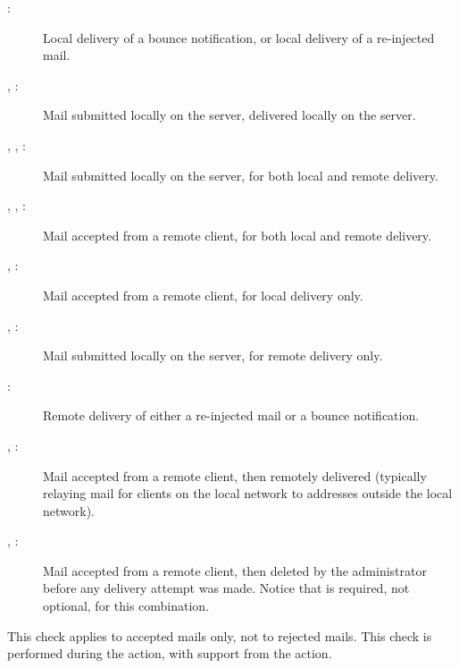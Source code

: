 \begin{description}

    \item [:] Local delivery of a bounce notification, or
        local delivery of a re-injected mail.

    \item [, :] Mail submitted locally on the
        server, delivered locally on the server.

    \item [, , :] Mail submitted
        locally \newline{} on the server, for both local and remote
        delivery.

    \item [, , :] Mail accepted
        from a remote client, for both local and remote delivery.

    \item [, :] Mail accepted from a remote
        client, for local delivery only.

    \item [, :] Mail submitted locally on the
        server, for remote delivery only.

    \item [:] Remote delivery of either a re-injected mail or
        a bounce notification.

    \item [, :] Mail accepted from a remote
        client, then remotely delivered (typically relaying mail for
        clients on the local network to addresses outside the local
        network).

    \item [, :] Mail accepted from a remote
        client, then deleted by the administrator before any delivery
        attempt was made.  Notice that  is required, not
        optional, for this combination.

\end{description}

This check applies to accepted mails only, not to rejected mails.  This
check is performed during the  action, with support from the
 action.

